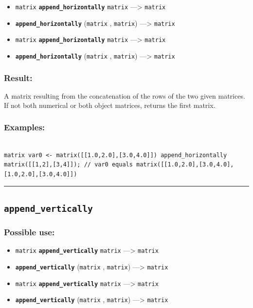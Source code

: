 \documentclass[]{book}
\providecommand{\tightlist}{%
  \setlength{\itemsep}{0pt}\setlength{\parskip}{0pt}}
\theoremstyle{definition}
\theoremstyle{definition}
\theoremstyle{definition}
\theoremstyle{remark}
\begin{document}
\begin{itemize}
\tightlist
\item
  \texttt{matrix} \textbf{\texttt{append\_horizontally}} \texttt{matrix}
  ---\textgreater{} \texttt{matrix}
\item
  \textbf{\texttt{append\_horizontally}} (\texttt{matrix} ,
  \texttt{matrix}) ---\textgreater{} \texttt{matrix}
\item
  \texttt{matrix} \textbf{\texttt{append\_horizontally}} \texttt{matrix}
  ---\textgreater{} \texttt{matrix}
\item
  \textbf{\texttt{append\_horizontally}} (\texttt{matrix} ,
  \texttt{matrix}) ---\textgreater{} \texttt{matrix}
\end{itemize}

\subsubsection{Result:}\label{result-38}

A matrix resulting from the concatenation of the rows of the two given
matrices. If not both numerical or both object matrices, returns the
first matrix.

\subsubsection{Examples:}\label{examples-31}

\begin{verbatim}
 
matrix var0 <- matrix([[1.0,2.0],[3.0,4.0]]) append_horizontally matrix([[1,2],[3,4]]); // var0 equals matrix([[1.0,2.0],[3.0,4.0],[1.0,2.0],[3.0,4.0]])
\end{verbatim}

\begin{center}\rule{0.5\linewidth}{\linethickness}\end{center}

\subsection{\texorpdfstring{\texttt{append\_vertically}}{append\_vertically}}\label{append_vertically}

\subsubsection{Possible use:}\label{possible-use-40}

\begin{itemize}
\tightlist
\item
  \texttt{matrix} \textbf{\texttt{append\_vertically}} \texttt{matrix}
  ---\textgreater{} \texttt{matrix}
\item
  \textbf{\texttt{append\_vertically}} (\texttt{matrix} ,
  \texttt{matrix}) ---\textgreater{} \texttt{matrix}
\item
  \texttt{matrix} \textbf{\texttt{append\_vertically}} \texttt{matrix}
  ---\textgreater{} \texttt{matrix}
\item
  \textbf{\texttt{append\_vertically}} (\texttt{matrix} ,
  \texttt{matrix}) ---\textgreater{} \texttt{matrix}
\end{itemize}
\end{document}
